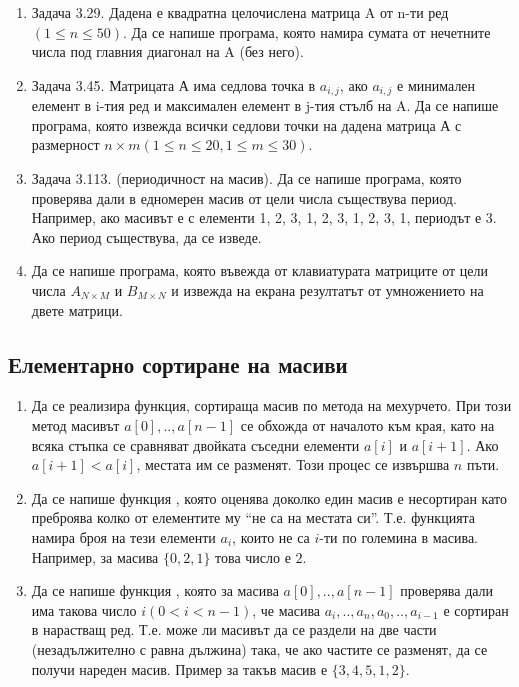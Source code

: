{\begin{enumerate}[resume]
	\item Задача 3.29. \cite{sbornik} Дадена е квадратна целочислена матрица A от n-ти ред $(1 \leq n \leq 50)$. Да се напише програма, която намира сумата от нечетните числа под главния диагонал на A (без него).

  \item Задача 3.45. \cite{sbornik} Матрицата А има седлова точка в $a_{i,j}$, ако $a_{i,j}$ е минимален елемент в i-тия ред и максимален елемент в j-тия стълб на A. Да се напише програма, която извежда всички седлови точки на дадена матрица А с размерност $n \times m (1 \leq n \leq 20, 1 \leq m \leq 30)$.

	\item Задача 3.113. (периодичност на масив). \cite{sbornik}	Да се напише програма, която проверява дали в едномерен масив от цели числа съществува период. Например, ако масивът е с елементи 1, 2, 3, 1, 2, 3, 1, 2, 3, 1, периодът е 3. Ако период съществува, да се изведе.

	\item Да се напише програма, която въвежда от клавиатурата матриците от цели числа $A_{N\times M}$ и $B_{M\times N}$ и извежда на екрана резултатът от умножението на двете матрици.


\end{enumerate}

\subsection {Елементарно сортиране на масиви}

\begin{enumerate}[resume]
  \item Да се реализира функция, сортираща масив по метода на мехурчето. При този метод масивът $a[0],..,a[n-1]$ се обхожда от началото към края, като на всяка стъпка се сравняват двойката съседни елементи $a[i]$ и $a[i+1]$. Ако $a[i+1] < a[i]$, местата им се разменят. Този процес се извършва $n$ пъти.
  \item Да се напише функция , която оценява доколко един масив е несортиран като преброява колко от елементите му ``не са на местата си''. Т.е. функцията намира броя на тези елементи $a_i$, които не са $i$-ти по големина в масива. Например, за масива $\{0,2,1\}$ това число е $2$.
  \item Да се напише функция , която за масива $a[0],..,a[n-1]$ проверява дали има такова число $i(0 < i < n-1)$, че масива $a_i,..,a_n,a_0,..,a_{i-1}$ е сортиран в нарастващ ред. Т.е. може ли масивът да се раздели на две части (незадължително с равна дължина) така, че ако частите се разменят, да се получи нареден масив. Пример за такъв масив е $\{3,4,5,1,2\}$.


\end{enumerate}}

